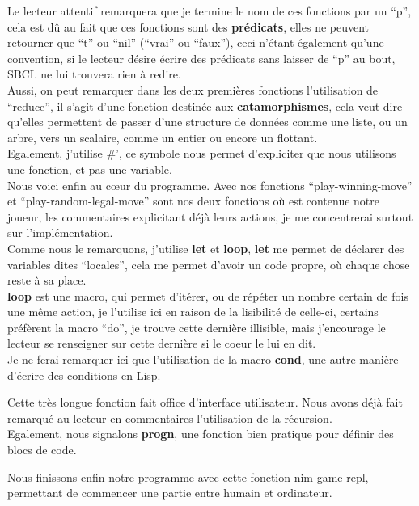\documentclass[a4paper, 12pt]{article}
\numberwithin{equation}{subsection}
\begin{document}
Le lecteur attentif remarquera que je termine le nom de ces fonctions par un ``p'', cela est dû au fait que ces fonctions sont des {\bf prédicats}, elles ne peuvent retourner que ``t'' ou ``nil'' (``vrai'' ou ``faux''), ceci n'étant également qu'une convention, si le lecteur désire écrire des prédicats sans laisser de ``p'' au bout, SBCL ne lui trouvera rien à redire.\\
Aussi, on peut remarquer dans les deux premières fonctions l'utilisation de ``reduce'', il s'agit d'une fonction destinée aux {\bf catamorphismes}, cela veut dire qu'elles permettent de passer d'une structure de données comme une liste, ou un arbre, vers un scalaire, comme un entier ou encore un flottant. \\
Egalement, j'utilise \#', ce symbole nous permet d'expliciter que nous utilisons une fonction, et pas une variable.\\

Nous voici enfin au cœur du programme. Avec nos fonctions ``play-winning-move'' et ``play-random-legal-move'' sont nos deux fonctions où est contenue notre joueur, les commentaires explicitant déjà leurs actions, je me concentrerai surtout sur l'implémentation. \\ Comme nous le remarquons, j'utilise {\bf let} et {\bf loop}, {\bf let} me permet de déclarer des variables dites ``locales'', cela me permet d'avoir un code propre, où chaque chose reste à sa place. \\ {\bf loop} est une macro, qui permet d'itérer, ou de répéter un nombre certain de fois une même action, je l'utilise ici en raison de la lisibilité de celle-ci, certains préfèrent la macro ``do'', je trouve cette dernière illisible, mais j'encourage le lecteur  se renseigner sur cette dernière si le coeur le lui en dit.\\

Je ne ferai remarquer ici que l'utilisation de la macro {\bf cond}, une autre manière d'écrire des conditions en Lisp.

Cette très longue fonction fait office d'interface utilisateur. Nous avons déjà fait remarqué au lecteur en commentaires l'utilisation de la récursion. \\
Egalement, nous signalons {\bf progn}, une fonction bien pratique pour définir des blocs de code.

Nous finissons enfin notre programme avec cette fonction nim-game-repl, permettant de commencer une partie entre humain et ordinateur.
\end{document}
